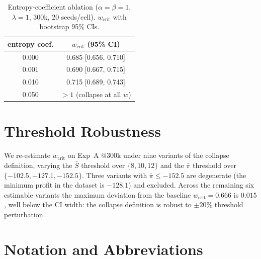 \documentclass[letterpaper]{article} %
\theoremstyle{plain}
\newcommand{\wcrit}{w_{\mathrm{crit}}}
\begin{document}
\begin{table}[t]
\centering \small
\caption{Entropy-coefficient ablation ($\alpha{=}\beta{=}1$, $\lambda{=}1$, 300k, 20
seeds/cell). $\wcrit$ with bootstrap 95\% CIs.}
\label{tab:entropy}
\begin{tabular}{cc}
\toprule
entropy coef. & $\wcrit$ (95\% CI) \\
\midrule
0.000 & 0.685 [0.656, 0.710] \\
0.001 & 0.690 [0.667, 0.715] \\
0.010 & 0.715 [0.689, 0.743] \\
0.050 & $>1$ (collapse at all $w$) \\
\bottomrule
\end{tabular}
\end{table}

\section{Threshold Robustness}
\label{sec:s_robustness}

We re-estimate $\wcrit$ on Exp~A @300k under nine variants of the collapse definition, varying
the $\bar S$ threshold over $\{8,10,12\}$ and the $\bar\pi$ threshold over
$\{-102.5,-127.1,-152.5\}$. Three variants with $\bar\pi\le-152.5$ are degenerate (the minimum
profit in the dataset is $-128.1$) and excluded. Across the remaining six estimable variants
the maximum deviation from the baseline $\wcrit=0.666$ is $0.015$, well below the CI width: the
collapse definition is robust to $\pm20\%$ threshold perturbation.

\section{Notation and Abbreviations}
\label{sec:s_notation}
\end{document}
